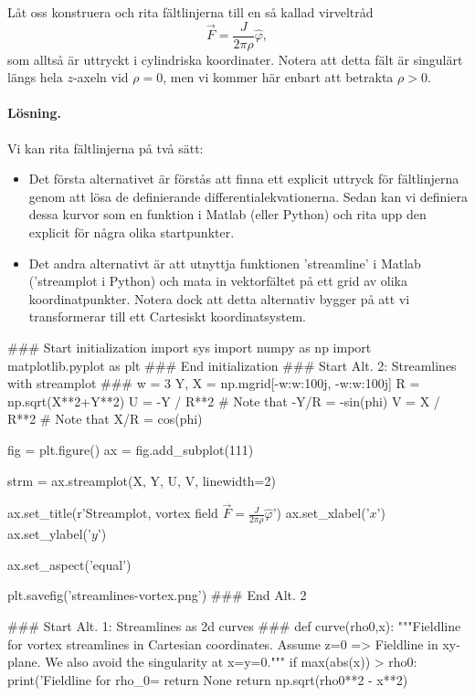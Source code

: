 \documentclass[%
oneside,                 %
final,                   %
10pt]{article}
\newenvironment{notice_mdfboxadmon}[1][]{
\begin{notice_mdfboxmdframed}[frametitle=#1]
}
{
\end{notice_mdfboxmdframed}
}
\begin{document}
\begin{notice_mdfboxadmon}
Låt oss konstruera och rita fältlinjerna till en så kallad virveltråd
\begin{equation}
\vec F = \frac{J}{2\pi\rho} \hat{\varphi}, 
\end{equation}
som alltså är uttryckt i cylindriska koordinater. Notera att detta fält är singulärt längs hela $z$-axeln vid $\rho=0$, men vi kommer här enbart att betrakta $\rho > 0$.

\paragraph{Lösning.}
Vi kan rita fältlinjerna på två sätt:
\begin{itemize}
\item Det första alternativet är förstås att finna ett explicit uttryck för fältlinjerna genom att lösa de definierande differentialekvationerna. Sedan kan vi definiera dessa kurvor som en funktion i Matlab (eller Python) och rita upp den explicit för några olika startpunkter.

\item Det andra alternativt är att utnyttja funktionen 'streamline' i Matlab ('streamplot i Python) och mata in vektorfältet på ett grid av olika koordinatpunkter. Notera dock att detta alternativ bygger på att vi transformerar till ett Cartesiskt koordinatsystem.
\end{itemize}

\noindent
\bpypro
### Start initialization
import sys
import numpy as np
import matplotlib.pyplot as plt
### End initialization
### Start Alt. 2: Streamlines with streamplot ###
w = 3
Y, X = np.mgrid[-w:w:100j, -w:w:100j]
R = np.sqrt(X**2+Y**2)
U = -Y / R**2 # Note that -Y/R = -sin(phi)
V = X / R**2  # Note that X/R = cos(phi)

fig = plt.figure()
ax = fig.add_subplot(111)

strm = ax.streamplot(X, Y, U, V, linewidth=2)

ax.set_title(r'Streamplot, vortex field $\vec{F} = \frac{J}{2\pi\rho}\hat\varphi$')
ax.set_xlabel('$x$')
ax.set_ylabel('$y$')

ax.set_aspect('equal')

plt.savefig('streamlines-vortex.png')
### End Alt. 2

### Start Alt. 1: Streamlines as 2d curves ###
def curve(rho0,x):
    """Fieldline for vortex streamlines in Cartesian coordinates.
    Assume z=0 => Fieldline in xy-plane.
    We also avoid the singularity at x=y=0."""
    if max(abs(x)) > rho0:
        print('Fieldline for rho_0=%
        return None
    return np.sqrt(rho0**2 - x**2)


\end{notice_mdfboxadmon}
\end{document}

